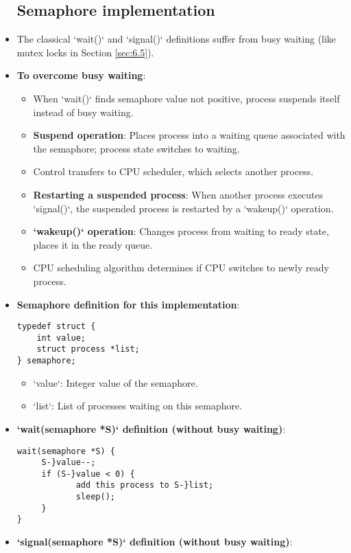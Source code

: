 \begin{itemize}
    \subsection{Semaphore implementation}
    \item The classical `wait()` and `signal()` definitions suffer from busy waiting (like mutex locks in Section \ref{sec:6.5}).
    \item \textbf{To overcome busy waiting}:
    \begin{itemize}
        \item When `wait()` finds semaphore value not positive, process suspends itself instead of busy waiting.
        \item \textbf{Suspend operation}: Places process into a waiting queue associated with the semaphore; process state switches to waiting.
        \item Control transfers to CPU scheduler, which selects another process.
        \item \textbf{Restarting a suspended process}: When another process executes `signal()`, the suspended process is restarted by a `wakeup()` operation.
        \item \textbf{`wakeup()` operation}: Changes process from waiting to ready state, places it in the ready queue.
        \item CPU scheduling algorithm determines if CPU switches to newly ready process.
    \end{itemize}
    \item \textbf{Semaphore definition for this implementation}:
\begin{verbatim}
typedef struct {
    int value;
    struct process *list;
} semaphore;
\end{verbatim}
    \begin{itemize}
        \item `value`: Integer value of the semaphore.
        \item `list`: List of processes waiting on this semaphore.
    \end{itemize}
    \item \textbf{`wait(semaphore *S)` definition (without busy waiting)}:
\begin{verbatim}
wait(semaphore *S) {
     S-}value--;
     if (S-}value < 0) {
            add this process to S-}list;
            sleep();
     }
}
\end{verbatim}
    \item \textbf{`signal(semaphore *S)` definition (without busy waiting)}:

\end{itemize}
